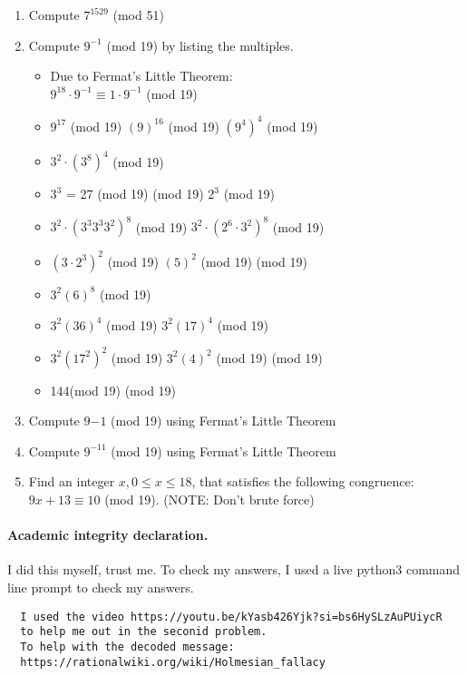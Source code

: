 \documentclass[11pt]{article}
\newcounter{prnum}
\newenvironment{problem}{{\vskip 0.2in\noindent\bf Problem
       \addtocounter{prnum}{1} \arabic{prnum}.}}{\vskip 0.1in}
\begin{document}
\begin{problem}
  \begin{enumerate}
    \item Compute $7^{1529}$ (mod 51)
    \item Compute $9^{-1}$ (mod 19) by listing the multiples.
      \begin{itemize}
        \item Due to Fermat's Little Theorem:\\
          $9^{18}\cdot9^{-1} \equiv 1\cdot9^{-1}$ (mod 19)
        \item $9^{17}$ (mod 19)  $(9)^{16}$ (mod 19)  $(9^{4})^{4}$ (mod 19)
        \item $3^{2} \cdot (3^{8})^{4}$ (mod 19)
        \item $3^3$ = 27 (mod 19)  (mod 19) \Rightarrow $2^3$ (mod 19)
        \item $3^2\cdot(3^3 3^3 3^2)^8 $ (mod 19) \equiv $3^2 \cdot (2^6\cdot3^2)^8$ (mod 19)
        \item $(3\cdot 2^3)^2$ (mod 19) \equiv $(5)^2$ (mod 19)  (mod 19)
        \item $3^2 (6)^8$ (mod 19)
        \item $3^2 (36)^4$ (mod 19) \equiv\space $3^2 (17)^4$ (mod 19)
        \item $3^2 (17^2)^2$ (mod 19) \equiv\space $3^2 (4)^2$ (mod 19)  (mod 19)
        \item 144(mod 19) (mod 19)
      \end{itemize}
    \item Compute $9{-1}$ (mod 19) using Fermat's Little Theorem
    \item Compute $9^{-11}$ (mod 19) using Fermat's Little Theorem
    \item Find an integer $x, 0 \leq x \leq 18$, that satisfies
      the following congruence: $9x + 13 \equiv 10$ (mod 19). (NOTE: Don't brute force)
  \end{enumerate}
\end{problem}


\vskip 0.2in
\paragraph{Academic integrity declaration.}
I did this myself, trust me. To check my answers, I used a live python3 command line prompt to check my answers.
\begin{verbatim}
  I used the video https://youtu.be/kYasb426Yjk?si=bs6HySLzAuPUiycR 
  to help me out in the seconid problem.
  To help with the decoded message:
  https://rationalwiki.org/wiki/Holmesian_fallacy
\end{verbatim}
\end{document}
